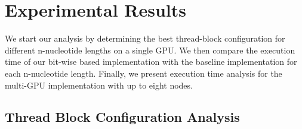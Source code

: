 \section {Experimental Results}
\label{sec:Result}

We start our analysis by determining the best thread-block configuration for different n-nucleotide lengths on a single GPU. We then compare the execution time of our bit-wise based implementation with the baseline \cite{b2} implementation for each n-nucleotide length. Finally, we present execution time analysis for the multi-GPU implementation with up to eight nodes.



\subsection {Thread Block Configuration Analysis}\label{subsec:thread}

